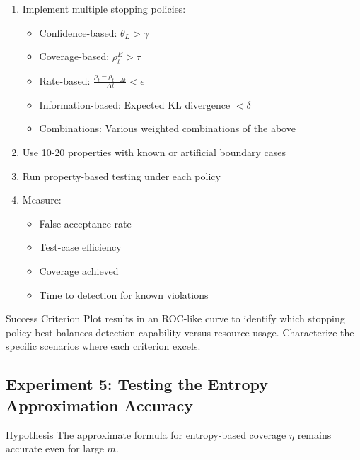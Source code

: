 \documentclass[11pt,a4paper]{article}
\begin{document}
\begin{tcolorbox}[
  colback=blue!5!white,
  colframe=blue!75!black,
  title=Experimental Design,
  fonttitle=\bfseries
]
\begin{enumerate}
\item Implement multiple stopping policies:
   \begin{itemize}
   \item Confidence-based: $\theta_L > \gamma$
   \item Coverage-based: $\rho_t^E > \tau$
   \item Rate-based: $\frac{\rho_t - \rho_{t-\Delta t}}{\Delta t} < \epsilon$
   \item Information-based: Expected KL divergence $< \delta$
   \item Combinations: Various weighted combinations of the above
   \end{itemize}
\item Use 10-20 properties with known or artificial boundary cases
\item Run property-based testing under each policy
\item Measure:
   \begin{itemize}
   \item False acceptance rate
   \item Test-case efficiency
   \item Coverage achieved
   \item Time to detection for known violations
   \end{itemize}
\end{enumerate}
\end{tcolorbox}

\begin{definitionbox}{Success Criterion}
Plot results in an ROC-like curve to identify which stopping policy best balances detection capability versus resource usage. Characterize the specific scenarios where each criterion excels.
\end{definitionbox}

\subsection{Experiment 5: Testing the Entropy Approximation Accuracy}

\begin{theorembox}{Hypothesis}
The approximate formula for entropy-based coverage $\eta$ remains accurate even for large $m$.
\end{theorembox}
\end{document}

